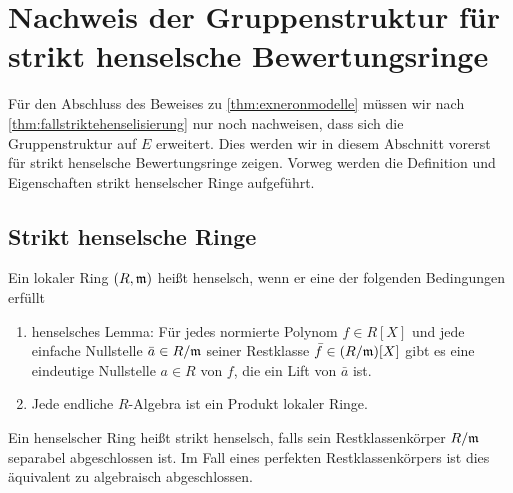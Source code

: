 \section[Gruppenstruktur für strikt henselsche Ringe]%
{Nachweis der Gruppenstruktur für strikt henselsche Bewertungsringe}
\label{chap:gruppestrikthenselsch}
Für den Abschluss des Beweises zu \ref{thm:exneronmodelle} müssen wir
nach \ref{thm:fallstriktehenselisierung} nur noch nachweisen, dass
sich die Gruppenstruktur auf $E$ erweitert.
Dies werden wir in diesem Abschnitt vorerst für strikt henselsche
Bewertungsringe zeigen. Vorweg werden die Definition und Eigenschaften
strikt henselscher Ringe aufgeführt.
\subsection{Strikt henselsche Ringe}
\begin{Definition}\label{def:henselscheringe}
  Ein lokaler Ring $(R,\mathfrak{m})$ heißt henselsch, wenn
  er eine der folgenden Bedingungen erfüllt
  \begin{enumerate}[label=(\roman*)]
  \item henselsches Lemma:
    Für jedes normierte Polynom $f\in R[X]$ und jede einfache Nullstelle
    $\bar a\in R/\mathfrak{m}$ seiner Restklasse $\bar f\in (R/\mathfrak{m})[X]$
    gibt es eine eindeutige Nullstelle $a\in R$ von $f$, die ein Lift
    von $\bar a$ ist.
  \item Jede endliche $R$-Algebra ist ein Produkt lokaler Ringe.
  \end{enumerate}
  Ein henselscher Ring heißt strikt henselsch, falls sein
  Restklassenkörper $R/\mathfrak{m}$ separabel abgeschlossen ist.
  Im Fall eines perfekten Restklassenkörpers ist dies äquivalent zu
  algebraisch abgeschlossen.
\end{Definition}

  

